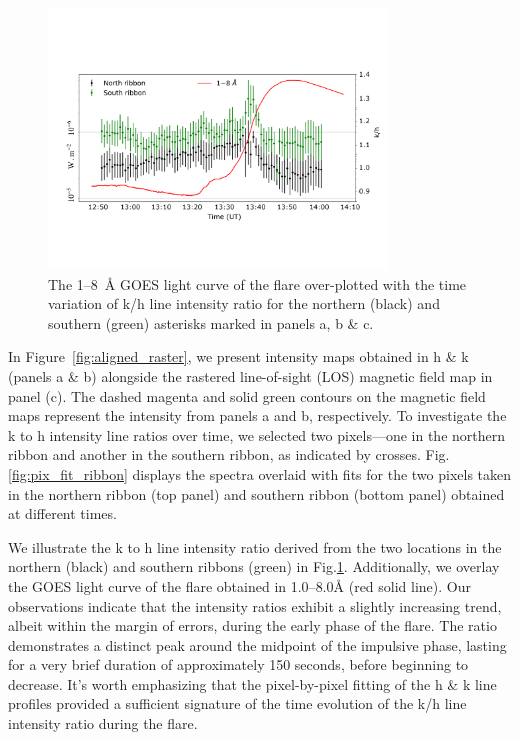 \begin{figure}[ht!]
\centering  
\includegraphics[trim={1.5cm 4cm 0.5cm 4cm},clip,width=0.8\textwidth]{Figures/m_flare_iris_pt2.pdf}
\caption{The 1{--}8~{\AA} GOES light curve of the flare over-plotted with the time variation of   k/h line intensity ratio for the northern (black) and southern (green) asterisks marked in panels a, b \& c.}
\label{fig:aligned_iris_ratio}
\end{figure}

In Figure~\ref{fig:aligned_raster}, we present intensity maps obtained in   h \& k (panels a \& b) alongside the rastered line-of-sight (LOS) magnetic field map in panel (c). The dashed magenta and solid green contours on the magnetic field maps represent the intensity from panels a and b, respectively. To investigate the   k to h intensity line ratios over time, we selected two pixels—one in the northern ribbon and another in the southern ribbon, as indicated by crosses. Fig.\ref{fig:pix_fit_ribbon} displays the spectra overlaid with fits for the two pixels taken in the northern ribbon (top panel) and southern ribbon (bottom panel) obtained at different times.

We illustrate the   k to h line intensity ratio derived from the two locations in the northern (black) and southern ribbons (green) in Fig.\ref{fig:aligned_iris_ratio}. Additionally, we overlay the GOES light curve of the flare obtained in 1.0{--}8.0{\AA} (red solid line). Our observations indicate that the intensity ratios exhibit a slightly increasing trend, albeit within the margin of errors, during the early phase of the flare. The ratio demonstrates a distinct peak around the midpoint of the impulsive phase, lasting for a very brief duration of approximately 150 seconds, before beginning to decrease. It's worth emphasizing that the pixel-by-pixel fitting of the   h \& k line profiles provided a sufficient signature of the time evolution of the k/h line intensity ratio during the flare.

